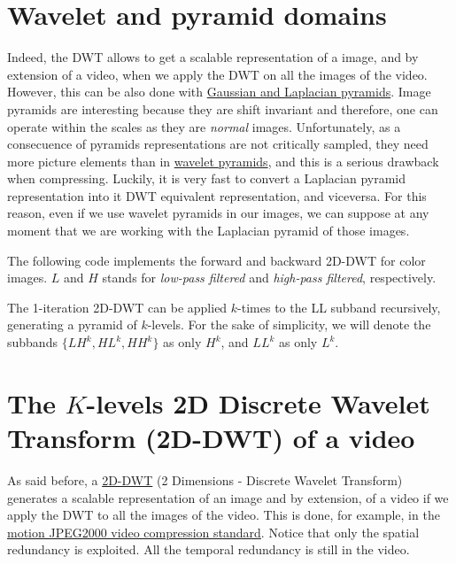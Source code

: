 \section{Wavelet and pyramid domains}
Indeed, the DWT allows to get a scalable representation of a image, and
by extension of a video, when we apply the DWT on all the images of the
video. However, this can be also done with
\href{https://en.wikipedia.org/wiki/Pyramid_(image_processing)}{Gaussian
and Laplacian pyramids}. Image pyramids are interesting because they are
shift invariant and therefore, one can operate within the scales as they
are \emph{normal} images. Unfortunately, as a consecuence of pyramids
representations are not critically sampled, they need more picture
elements than in
\href{http://www.vtvt.ece.vt.edu/research/references/video/DCT_Video_Compression/Zhang92a.pdf}{wavelet
pyramids}, and this is a serious drawback when compressing. Luckily, it
is very fast to convert a Laplacian pyramid representation into it DWT
equivalent representation, and viceversa. For this reason, even if we
use wavelet pyramids in our images, we can suppose at any moment that we
are working with the Laplacian pyramid of those images.

The following code implements the forward and backward 2D-DWT for
color images. $L$ and $H$ stands for \emph{low-pass
  filtered} and \emph{high-pass filtered}, respectively.



The 1-iteration 2D-DWT can be applied $k$-times to the LL subband
recursively, generating a pyramid of $k$-levels. For the sake of
simplicity, we will denote the subbands $\{LH^k, HL^k, HH^k\}$ as
only $H^k$, and $LL^k$ as only $L^k$.



\section{The $K$-levels 2D Discrete Wavelet Transform (2D-DWT) of a
video}
As said before, a
\href{https://en.wikipedia.org/wiki/Discrete_wavelet_transform}{2D-DWT}
(2 Dimensions - Discrete Wavelet Transform) generates a scalable
representation of an image and by extension, of a video if we apply the
DWT to all the images of the video. This is done, for example, in the
\href{https://en.wikipedia.org/wiki/JPEG_2000}{motion JPEG2000 video
compression standard}. Notice that only the spatial redundancy is
exploited. All the temporal redundancy is still in the video.

